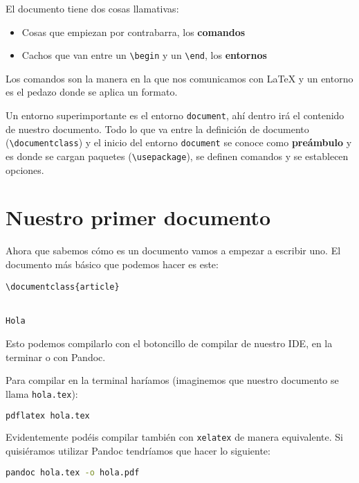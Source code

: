 El documento tiene dos cosas llamativas:

\begin{itemize}
\item
  Cosas que empiezan por contrabarra, los \textbf{comandos}
\item
  Cachos que van entre un \lstinline!\begin! y un \lstinline!\end!, los
  \textbf{entornos}
\end{itemize}

Los comandos son la manera en la que nos comunicamos con LaTeX y un
entorno es el pedazo donde se aplica un formato.

Un entorno superimportante es el entorno \lstinline!document!, ahí
dentro irá el contenido de nuestro documento. Todo lo que va entre la
definición de documento (\lstinline!\documentclass!) y el inicio del
entorno \lstinline!document! se conoce como \textbf{preámbulo} y es
donde se cargan paquetes (\lstinline!\usepackage!), se definen comandos
y se establecen opciones.

\section{Nuestro primer documento}\label{nuestro-primer-documento}

Ahora que sabemos cómo es un documento vamos a empezar a escribir uno.
El documento más básico que podemos hacer es este:

\begin{lstlisting}
\documentclass{article}


Hola

\end{lstlisting}

Esto podemos compilarlo con el botoncillo de compilar de nuestro IDE, en
la terminar o con Pandoc.

Para compilar en la terminal haríamos (imaginemos que nuestro documento
se llama \lstinline!hola.tex!):

\begin{lstlisting}[language=bash]
pdflatex hola.tex
\end{lstlisting}

Evidentemente podéis compilar también con \lstinline!xelatex! de manera
equivalente. Si quisiéramos utilizar Pandoc tendríamos que hacer lo
siguiente:

\begin{lstlisting}[language=bash]
pandoc hola.tex -o hola.pdf
\end{lstlisting}

